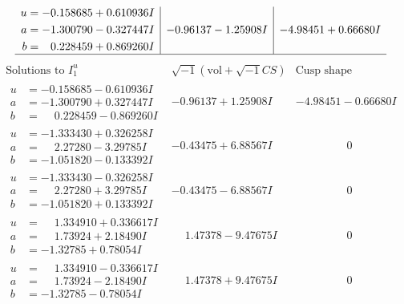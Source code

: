 \documentclass[1p]{elsarticle_modified}
\theoremstyle{definition}
\newcommand{\I}{\sqrt{-1}}
\begin{document}
$$\begin{array}{c|c|c}
\begin{aligned}
u &= -0.158685 + 0.610936 I \\
a &= -1.300790 - 0.327447 I \\
b &= \phantom{-}0.228459 + 0.869260 I\end{aligned}
 & -0.96137 - 1.25908 I & -4.98451 + 0.66680 I\\
 \hline 
 \end{array}$$\newpage$$\begin{array}{c|c|c}  
\text{Solutions to }I^u_{1}& \I (\text{vol} + \sqrt{-1}CS) & \text{Cusp shape}\\
 \hline 
\begin{aligned}
u &= -0.158685 - 0.610936 I \\
a &= -1.300790 + 0.327447 I \\
b &= \phantom{-}0.228459 - 0.869260 I\end{aligned}
 & -0.96137 + 1.25908 I & -4.98451 - 0.66680 I \\ \hline\begin{aligned}
u &= -1.333430 + 0.326258 I \\
a &= \phantom{-}2.27280 - 3.29785 I \\
b &= -1.051820 - 0.133392 I\end{aligned}
 & -0.43475 + 6.88567 I & \phantom{-0.000000 } 0 \\ \hline\begin{aligned}
u &= -1.333430 - 0.326258 I \\
a &= \phantom{-}2.27280 + 3.29785 I \\
b &= -1.051820 + 0.133392 I\end{aligned}
 & -0.43475 - 6.88567 I & \phantom{-0.000000 } 0 \\ \hline\begin{aligned}
u &= \phantom{-}1.334910 + 0.336617 I \\
a &= \phantom{-}1.73924 + 2.18490 I \\
b &= -1.32785 + 0.78054 I\end{aligned}
 & \phantom{-}1.47378 - 9.47675 I & \phantom{-0.000000 } 0 \\ \hline\begin{aligned}
u &= \phantom{-}1.334910 - 0.336617 I \\
a &= \phantom{-}1.73924 - 2.18490 I \\
b &= -1.32785 - 0.78054 I\end{aligned}
 & \phantom{-}1.47378 + 9.47675 I & \phantom{-0.000000 } 0 \\ \hline\begin{aligned}

\end{aligned}
\end{array}$$
\end{document}
